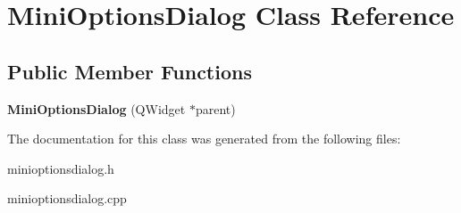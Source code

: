 \hypertarget{classMiniOptionsDialog}{
\section{MiniOptionsDialog Class Reference}
\label{classMiniOptionsDialog}
}
\subsection*{Public Member Functions}
\begin{DoxyCompactItemize}
\item 
\hypertarget{classMiniOptionsDialog_adbe64419c5344f8d51c78865b8fec3e2}{
{\bfseries MiniOptionsDialog} (QWidget $\ast$parent)}
\label{classMiniOptionsDialog_adbe64419c5344f8d51c78865b8fec3e2}

\end{DoxyCompactItemize}


The documentation for this class was generated from the following files:\begin{DoxyCompactItemize}
\item 
minioptionsdialog.h\item 
minioptionsdialog.cpp\end{DoxyCompactItemize}
